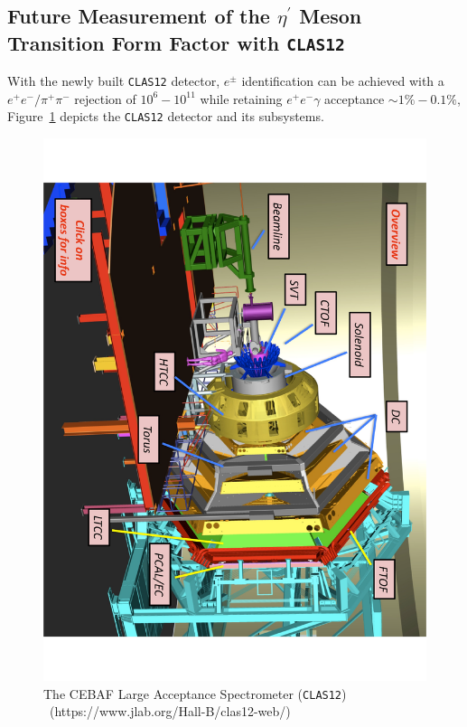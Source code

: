 \documentclass{aip-cp}
\begin{document}
\subsection{Future Measurement of the $\eta^\prime$ Meson Transition Form Factor with \textsc{\texttt{CLAS12}}}
With the newly built \textsc{\texttt{CLAS12}} detector, $e^{\pm}$ identification can be achieved with a $e^{+}e^{-}/\pi^{+}\pi^{-}$ rejection of  $10^{6}-10^{11}$ while retaining $e^+ e^- \gamma$ acceptance $\sim 1 \% - 0.1 \%$, Figure~\ref{fig:clas12} depicts the \textsc{\texttt{CLAS12}} detector and its subsystems.
\begin{figure}[h!]
	\centerline{\includegraphics[angle = 90,width=250 pt]{figures/clas12-design.pdf}}
	\caption{The CEBAF Large Acceptance Spectrometer (\textsc{\texttt{CLAS12}})\\~(https://www.jlab.org/Hall-B/clas12-web/)}
	\label{fig:clas12}
\end{figure}
\end{document}
